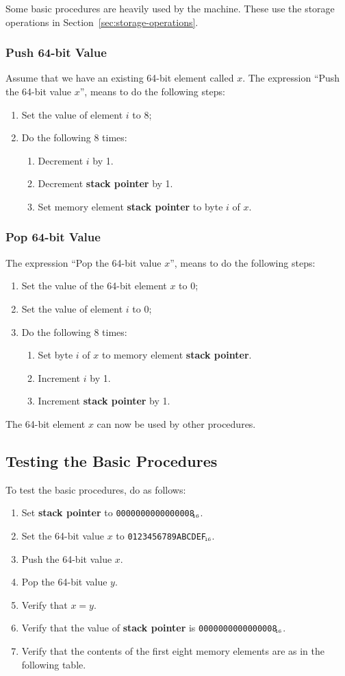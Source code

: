 \documentclass[a4paper,12pt]{article}
\newcommand{\num}[1]{\texttt{#1}\xspace}
\newcommand{\hex}[1]{\num{#1}$_{\textup{\tiny\hskip-1ex 16}}$\xspace}
\newcommand{\SP}{\textbf{stack pointer}\xspace}
\begin{document}
Some basic procedures are heavily used by the machine.
These use the storage operations in Section~\ref{sec:storage-operations}.

\subsubsection{Push 64-bit Value}

Assume that we have an existing 64-bit element called $x$.
The expression ``Push the 64-bit value $x$'', means to do the following steps:
\begin{enumerate}
\item Set the value of element $i$ to 8;
\item Do the following 8 times:
  \begin{enumerate}
  \item Decrement $i$ by 1.
  \item Decrement \SP by 1.
  \item Set memory element \SP to byte $i$ of $x$.
  \end{enumerate}
\end{enumerate}

\subsubsection{Pop 64-bit Value}

The expression ``Pop the 64-bit value $x$'', means to do the following steps:
\begin{enumerate}
\item Set the value of the 64-bit element $x$ to 0;
\item Set the value of element $i$ to 0;
\item Do the following 8 times:
  \begin{enumerate}
  \item Set byte $i$ of $x$ to memory element \SP.
  \item Increment $i$ by 1.
  \item Increment \SP by 1.
  \end{enumerate}
\end{enumerate}
The 64-bit element $x$ can now be used by other procedures.

\subsection{Testing the Basic Procedures}

To test the basic procedures, do as follows:
\begin{enumerate}
\item Set \SP to \hex{0000000000000008}.
\item Set the 64-bit value $x$ to \hex{0123456789ABCDEF}.
\item Push the 64-bit value $x$.
\item Pop the 64-bit value $y$.
\item Verify that $x=y$.
\item Verify that the value of \SP is \hex{0000000000000008}.
\item Verify that the contents of the first eight memory elements are as in the following table.
\end{enumerate}
\end{document}

